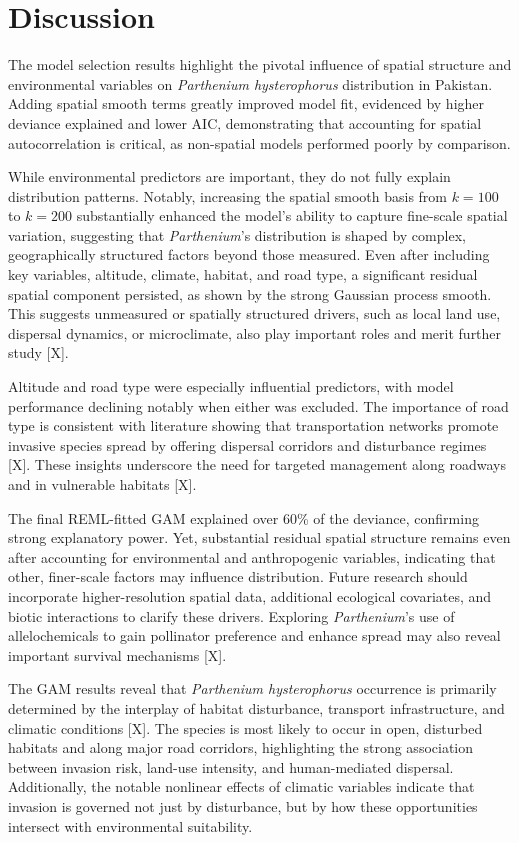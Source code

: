 \chapter{Discussion}

The model selection results highlight the pivotal influence of spatial structure and environmental variables on \textit{Parthenium hysterophorus} distribution in Pakistan. Adding spatial smooth terms greatly improved model fit, evidenced by higher deviance explained and lower AIC, demonstrating that accounting for spatial autocorrelation is critical, as non-spatial models performed poorly by comparison.

While environmental predictors are important, they do not fully explain distribution patterns. Notably, increasing the spatial smooth basis from $k = 100$ to $k = 200$ substantially enhanced the model's ability to capture fine-scale spatial variation, suggesting that \textit{Parthenium}'s distribution is shaped by complex, geographically structured factors beyond those measured. Even after including key variables, altitude, climate, habitat, and road type, a significant residual spatial component persisted, as shown by the strong Gaussian process smooth. This suggests unmeasured or spatially structured drivers, such as local land use, dispersal dynamics, or microclimate, also play important roles and merit further study [X].

Altitude and road type were especially influential predictors, with model performance declining notably when either was excluded. The importance of road type is consistent with literature showing that transportation networks promote invasive species spread by offering dispersal corridors and disturbance regimes [X]. These insights underscore the need for targeted management along roadways and in vulnerable habitats [X].

The final REML-fitted GAM explained over 60\% of the deviance, confirming strong explanatory power. Yet, substantial residual spatial structure remains even after accounting for environmental and anthropogenic variables, indicating that other, finer-scale factors may influence distribution. Future research should incorporate higher-resolution spatial data, additional ecological covariates, and biotic interactions to clarify these drivers. Exploring \textit{Parthenium}'s use of allelochemicals to gain pollinator preference and enhance spread may also reveal important survival mechanisms [X].

The GAM results reveal that \textit{Parthenium hysterophorus} occurrence is primarily determined by the interplay of habitat disturbance, transport infrastructure, and climatic conditions [X]. The species is most likely to occur in open, disturbed habitats and along major road corridors, highlighting the strong association between invasion risk, land-use intensity, and human-mediated dispersal. Additionally, the notable nonlinear effects of climatic variables indicate that invasion is governed not just by disturbance, but by how these opportunities intersect with environmental suitability.

